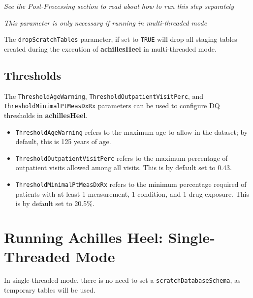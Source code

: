 \documentclass[]{article}
\providecommand{\tightlist}{%
  \setlength{\itemsep}{0pt}\setlength{\parskip}{0pt}}
\begin{document}
\emph{See the Post-Processing section to read about how to run this step
separately}

\emph{This parameter is only necessary if running in multi-threaded
mode}

The \texttt{dropScratchTables} parameter, if set to \texttt{TRUE} will
drop all staging tables created during the execution of
\textbf{achillesHeel} in multi-threaded mode.

\subsection{Thresholds}\label{thresholds}

The \texttt{ThresholdAgeWarning}, \texttt{ThresholdOutpatientVisitPerc},
and \texttt{ThresholdMinimalPtMeasDxRx} parameters can be used to
configure DQ thresholds in \textbf{achillesHeel}.

\begin{itemize}
\tightlist
\item
  \texttt{ThresholdAgeWarning} refers to the maximum age to allow in the
  dataset; by default, this is 125 years of age.
\item
  \texttt{ThresholdOutpatientVisitPerc} refers to the maximum percentage
  of outpatient visits allowed among all visits. This is by default set
  to 0.43.
\item
  \texttt{ThresholdMinimalPtMeasDxRx} refers to the minimum percentage
  required of patients with at least 1 measurement, 1 condition, and 1
  drug exposure. This is by default set to 20.5\%.
\end{itemize}

\section{Running Achilles Heel: Single-Threaded
Mode}\label{running-achilles-heel-single-threaded-mode}

In single-threaded mode, there is no need to set a
\texttt{scratchDatabaseSchema}, as temporary tables will be used.
\end{document}

